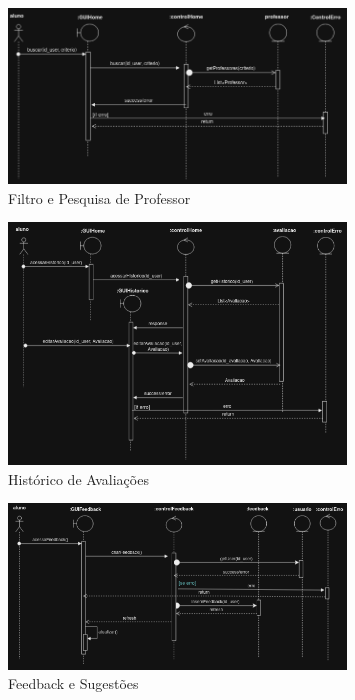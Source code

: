 \documentclass[12pt]{article}
\begin{document}
\begin{figure}[H]
    \centering
    \includegraphics[width=0.8\textwidth]{diagramas/i8-filtro-pesq-professor.png}
    \caption{Filtro e Pesquisa de Professor}
    \label{fig:i8-filtro-pesq-professor}
\end{figure}

\begin{figure}[H]
    \centering
    \includegraphics[width=0.8\textwidth]{diagramas/i9-historico-avaliacoes.png}
    \caption{Histórico de Avaliações}
    \label{fig:i9-historico-avaliacoes}
\end{figure}

\begin{figure}[H]
    \centering
    \includegraphics[width=0.8\textwidth]{diagramas/i10-feedback-sugestoes.png}
    \caption{Feedback e Sugestões}
    \label{fig:i10-feedback-sugestoes}
\end{figure}
\end{document}
